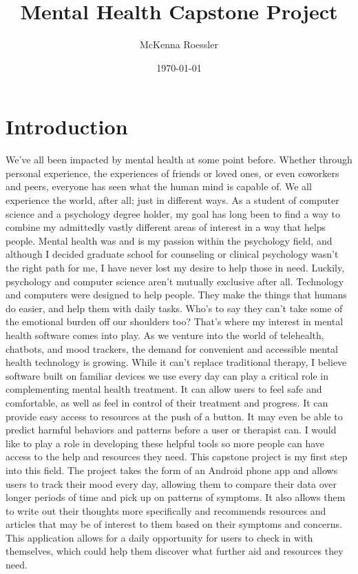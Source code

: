 \documentclass{article}
\title{Mental Health Capstone Project}
\author{McKenna Roessler}
\date{\today}
\begin{document}
\maketitle

\section{Introduction}
We've all been impacted by mental health at some point before. Whether through personal experience, 
the experiences of friends or loved ones, or even coworkers and peers, everyone has seen what the human mind is capable of. We all experience the world, after all; just in different ways. As a student of computer science and a psychology degree holder, my goal has long been to find a way to combine my admittedly vastly different areas of interest in a way that helps people. Mental health was and is my passion within the psychology field, and although I decided graduate school for counseling or clinical psychology wasn't the right path for me, I have never lost my desire to help those in need. Luckily, psychology and computer science aren't mutually exclusive after all. Technology and computers were designed to help people. They make the things that humans do easier, and help them with daily tasks. Who's to say they can't take some of the emotional burden off our shoulders too? That's where my interest in mental health software comes into play. As we venture into the world of telehealth, chatbots, and mood trackers, the demand for convenient and accessible mental health technology is growing. While it can't replace traditional therapy, I believe software built on familiar devices we use every day can play a critical role in complementing mental health treatment. It can allow users to feel safe and comfortable, as well as feel in control of their treatment and progress. It can provide easy access to resources at the push of a button. It may even be able to predict harmful behaviors and patterns before a user or therapist can. I would like to play a role in developing these helpful tools so more people can have access to the help and resources they need. This capstone project is my first step into this field. The project takes the form of an Android phone app and allows users to track their mood every day, allowing them to compare their data over longer periods of time and pick up on patterns of symptoms. It also allows them to write out their thoughts more specifically and recommends resources and articles that may be of interest to them based on their symptoms and concerns. This application allows for a daily opportunity for users to check in with themselves, which could help them discover what further aid and resources they need.
\end{document}
